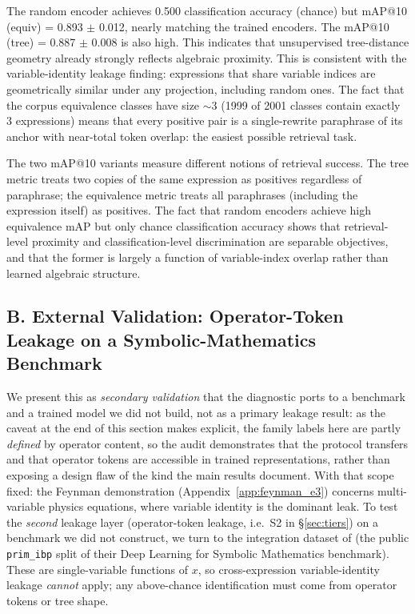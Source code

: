 The random encoder achieves 0.500 classification accuracy (chance) but mAP@10 (equiv) = 0.893 $\pm$ 0.012, nearly matching the trained encoders. The mAP@10 (tree) = 0.887 $\pm$ 0.008 is also high. This indicates that unsupervised tree-distance geometry already strongly reflects algebraic proximity. This is consistent with the variable-identity leakage finding: expressions that share variable indices are geometrically similar under any projection, including random ones. The fact that the corpus equivalence classes have size $\sim$3 (1999 of 2001 classes contain exactly 3 expressions) means that every positive pair is a single-rewrite paraphrase of its anchor with near-total token overlap: the easiest possible retrieval task.

The two mAP@10 variants measure different notions of retrieval success. The tree metric treats two copies of the same expression as positives regardless of paraphrase; the equivalence metric treats all paraphrases (including the expression itself) as positives. The fact that random encoders achieve high equivalence mAP but only chance classification accuracy shows that retrieval-level proximity and classification-level discrimination are separable objectives, and that the former is largely a function of variable-index overlap rather than learned algebraic structure.

\subsection*{B. External Validation: Operator-Token Leakage on a Symbolic-Mathematics Benchmark}

We present this as \emph{secondary validation} that the diagnostic ports to a benchmark and a trained model we did not build, not as a primary leakage result: as the caveat at the end of this section makes explicit, the family labels here are partly \emph{defined} by operator content, so the audit demonstrates that the protocol transfers and that operator tokens are accessible in trained representations, rather than exposing a design flaw of the kind the main results document. With that scope fixed: the Feynman demonstration (Appendix~\ref{app:feynman_e3}) concerns multi-variable physics equations, where variable identity is the dominant leak. To test the \emph{second} leakage layer (operator-token leakage, i.e.\ S2 in \S\ref{sec:tiers}) on a benchmark we did not construct, we turn to the integration dataset of \citet{lample2019deep} (the public \texttt{prim\_ibp} split of their Deep Learning for Symbolic Mathematics benchmark). These are single-variable functions of $x$, so cross-expression variable-identity leakage \emph{cannot} apply; any above-chance identification must come from operator tokens or tree shape.

